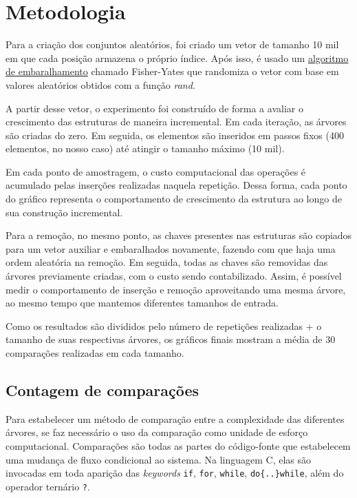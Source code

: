 \documentclass[a4paper, 12pt]{article}
\begin{document}
\newpage

\section{Metodologia}
Para a criação dos conjuntos aleatórios, foi criado um vetor de tamanho 10 mil
em que cada posição armazena o próprio índice. Após isso, é usado um
\href{https://benpfaff.org/writings/clc/shuffle.html}{algoritmo de embaralhamento}
chamado Fisher-Yates
que randomiza o vetor com base em valores aleatórios obtidos com a função \textit{rand}.

A partir desse vetor, o experimento foi construído de forma a avaliar o crescimento
das estruturas de maneira incremental. Em cada iteração, as árvores são criadas do zero.
Em seguida, os elementos são inseridos em passos fixos (400 elementos, no nosso caso) até
atingir o tamanho máximo (10 mil).

Em cada ponto de amostragem, o custo computacional das operações é acumulado pelas inserções
realizadas naquela repetição. Dessa forma, cada ponto do gráfico representa o comportamento
de crescimento da estrutura ao longo de sua construção incremental.

Para a remoção, no mesmo ponto, as chaves presentes nas estruturas são copiados para um vetor
auxiliar e embaralhados novamente, fazendo com que haja uma ordem aleatória na remoção.
Em seguida, todas as chaves são removidas das árvores previamente criadas, com o custo
sendo contabilizado. Assim, é possível medir o comportamento de inserção e remoção aproveitando
uma mesma árvore, ao mesmo tempo que mantemos diferentes tamanhos de entrada.

Como os resultados são divididos pelo número de repetições realizadas + o tamanho de suas
respectivas árvores, os gráficos finais mostram a média de 30 comparações realizadas em cada
tamanho.

\subsection{Contagem de comparações}
Para estabelecer um método de comparação entre a complexidade das diferentes árvores,
se faz necessário o uso da comparação como unidade de esforço computacional.
Comparações são todas as partes do código-fonte que estabelecem uma mudança de fluxo
condicional ao sistema. Na linguagem C, elas são invocadas em toda aparição das
\textit{keywords} \verb|if|, \verb|for|, \verb|while|, \verb|do{..}while|,
além do operador ternário \verb|?|.
\end{document}
